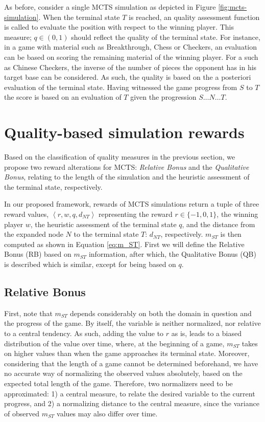 \documentclass{ecai2010}
\newcommand{\tuple}[1]{\ensuremath{\left \langle #1 \right \rangle }}
\begin{document}
As before, consider a single MCTS simulation as depicted in Figure \ref{fig:mcts-simulation}. When the terminal state $T$ is reached, an quality assessment function is called to evaluate the position with respect to the winning player. This measure; $q \in (0, 1)$ should reflect the quality of the terminal state. For instance, in a game with material such as Breakthrough, Chess or Checkers, an evaluation can be based on scoring the remaining material of the winning player. For a such as Chinese Checkers, the inverse of the number of pieces the opponent has in his target base can be considered. As such, the quality is based on the a posteriori evaluation of the terminal state. Having witnessed the game progress from $S$ to $T$ the score is based on an evaluation of $T$ given the progression $S \ldots N \ldots T$.

\section{Quality-based simulation rewards}
\label{sec:qoreward}
Based on the classification of quality measures in the previous section, we propose two reward alterations for MCTS: \emph{Relative Bonus} and the \emph{Qualitative Bonus}, relating to the length of the simulation and the heuristic assessment of the terminal state, respectively. 

In our proposed framework, rewards of MCTS simulations return a tuple of three reward values, $\tuple{r, w, q, d_{NT}}$ representing the reward $r \in \{-1, 0, 1\}$, the winning player $w$, the heuristic assessment of the terminal state $q$, and the distance from the expanded node $N$ to the terminal state $T$: $d_{NT}$, respectively. $m_{ST}$ is then computed as shown in Equation \ref{eq:m_ST}. First we will define the Relative Bonus (RB) based on $m_{ST}$ information, after which, the Qualitative Bonus (QB) is described which is similar, except for being based on $q$.

\subsection{Relative Bonus}
\label{subsec:rb}
First, note that $m_{ST}$ depends considerably on both the domain in question and the progress of the game. By itself, the variable is neither normalized, nor relative to a central tendency. As such, adding the value to $r$ as is, leads to a biased distribution of the value over time, where, at the beginning of a game, $m_{ST}$ takes on higher values than when the game approaches its terminal state. Moreover, considering that the length of a game cannot be determined beforehand, we have no accurate way of normalizing the observed values absolutely, based on the expected total length of the game. Therefore, two normalizers need to be approximated: 1) a central measure, to relate the desired variable to the current progress, and 2) a normalizing distance to the central measure, since the variance of observed $m_{ST}$ values may also differ over time.
\end{document}
